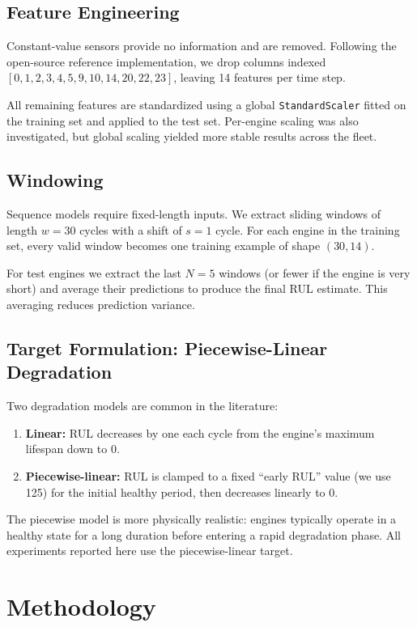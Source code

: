 \documentclass[11pt,a4paper]{article}
\begin{document}
\subsection{Feature Engineering}
Constant-value sensors provide no information and are removed. Following the open-source reference implementation, we drop columns indexed $[0,1,2,3,4,5,9,10,14,20,22,23]$, leaving 14 features per time step.

All remaining features are standardized using a global \texttt{StandardScaler} fitted on the training set and applied to the test set. Per-engine scaling was also investigated, but global scaling yielded more stable results across the fleet.

\subsection{Windowing}
Sequence models require fixed-length inputs. We extract sliding windows of length $w=30$ cycles with a shift of $s=1$ cycle. For each engine in the training set, every valid window becomes one training example of shape $(30, 14)$.

For test engines we extract the last $N=5$ windows (or fewer if the engine is very short) and average their predictions to produce the final RUL estimate. This averaging reduces prediction variance.

\subsection{Target Formulation: Piecewise-Linear Degradation}
Two degradation models are common in the literature:
\begin{enumerate}
    \item \textbf{Linear:} RUL decreases by one each cycle from the engine's maximum lifespan down to 0.
    \item \textbf{Piecewise-linear:} RUL is clamped to a fixed ``early RUL'' value (we use 125) for the initial healthy period, then decreases linearly to 0.
\end{enumerate}
The piecewise model is more physically realistic: engines typically operate in a healthy state for a long duration before entering a rapid degradation phase. All experiments reported here use the piecewise-linear target.

\section{Methodology}
\end{document}
